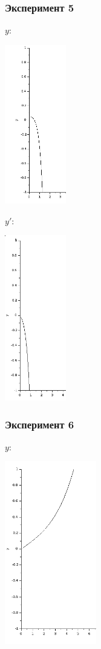\documentclass[12pt, a4paper] {ncc}
\begin{document}
\subsubsection{Эксперимент 5}

$y$:
\begin{center}
\includegraphics[width=0.2\textwidth]{5y}
\end{center}

$y'$:
\begin{center}
\includegraphics[width=0.2\textwidth]{5y1}
\end{center}

\subsubsection{Эксперимент 6}

$y$:
\begin{center}
\includegraphics[width=0.3\textwidth]{6y}
\end{center}
\end{document}
